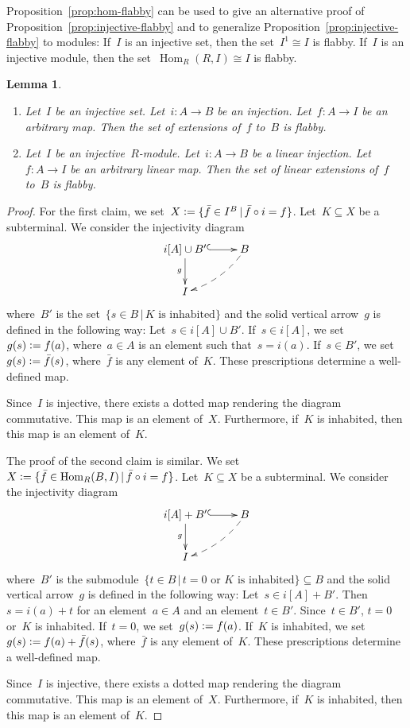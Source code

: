 \documentclass[oneside]{amsart}
\theoremstyle{definition}
\theoremstyle{plain}
\newtheorem{lemma}[defn]{Lemma}
\theoremstyle{remark}
\newcommand{\defeq}{\vcentcolon=}
\DeclareMathOperator{\Hom}{Hom}
\renewcommand{\_}{\mathpunct{.}\,}
\begin{document}
Proposition~\ref{prop:hom-flabby} can be used to give an alternative proof of
Proposition~\ref{prop:injective-flabby} and to generalize
Proposition~\ref{prop:injective-flabby} to modules: If~$I$ is an injective set,
then the set~$I^1 \cong I$ is flabby. If~$I$ is an injective module, then the
set~$\Hom_R(R,I) \cong I$ is flabby.

\begin{lemma}\label{lemma:set-of-extensions-flabby}
\begin{enumerate}
\item Let~$I$ be an injective set. Let~$i : A \to B$ be an injection.
Let~$f : A \to I$ be an arbitrary map. Then the set of extensions of~$f$ to~$B$
is flabby.
\item Let~$I$ be an injective~$R$-module. Let~$i : A \to B$ be a linear injection.
Let~$f : A \to I$ be an arbitrary linear map. Then the set of linear extensions of~$f$ to~$B$
is flabby.
\end{enumerate}
\end{lemma}

\begin{proof}For the first claim, we set~$X \defeq \{ \bar{f} \in I^B \,|\, \bar{f} \circ i =
f \}$. Let~$K \subseteq X$ be a subterminal. We consider the injectivity diagram
\[ \xymatrix{
  i[A] \cup B' \ar@{^{(}->}[r]\ar[d]_g & B \ar@{-->}@/^/[ld] \\
  I
} \]
where~$B'$ is the set~$\{ s \in B \,|\, \text{$K$ is inhabited} \}$ and the solid
vertical arrow~$g$ is defined in the following way: Let~$s \in i[A] \cup B'$.
If~$s \in i[A]$, we set~$g(s) \defeq f(a)$, where~$a \in A$ is an element such
that~$s = i(a)$. If~$s \in B'$, we set~$g(s) \defeq \bar{f}(s)$,
where~$\bar{f}$ is any element of~$K$. These prescriptions determine a well-defined
map.

Since~$I$ is injective, there exists a dotted map rendering the diagram
commutative. This map is an element of~$X$. Furthermore, if~$K$ is inhabited,
then this map is an element of~$K$.

The proof of the second claim is similar. We
set~$X \defeq \{ \bar{f} \in \Hom_R(B,I) \,|\, \bar{f} \circ i =
f \}$. Let~$K \subseteq X$ be a subterminal. We consider the injectivity diagram
\[ \xymatrix{
  i[A] + B' \ar@{^{(}->}[r]\ar[d]_g & B \ar@{-->}@/^/[ld] \\
  I
} \]
where~$B'$ is the submodule~$\{ t \in B \,|\, \text{$t = 0$ or $K$ is
inhabited} \} \subseteq B$ and the solid vertical arrow~$g$ is defined in the following
way: Let~$s \in i[A] + B'$. Then~$s = i(a) + t$ for an element~$a \in A$ and an
element~$t \in B'$. Since~$t \in B'$, $t = 0$ or~$K$ is inhabited. If~$t = 0$,
we set~$g(s) \defeq f(a)$. If~$K$ is inhabited, we set~$g(s) \defeq f(a) +
\bar{f}(s)$, where~$\bar{f}$ is any element of~$K$. These prescriptions
determine a well-defined map.

Since~$I$ is injective, there exists a dotted map rendering the diagram
commutative. This map is an element of~$X$. Furthermore, if~$K$ is inhabited,
then this map is an element of~$K$.
\end{proof}
\end{document}
